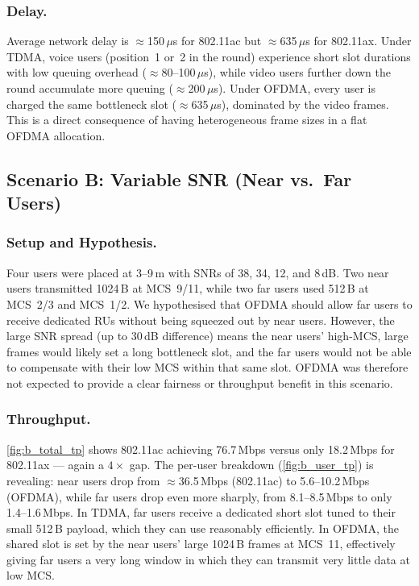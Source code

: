 \documentclass[twocolumn]{article}
\begin{document}
\subsubsection{Delay.}
Average network delay is $\approx$150\,$\mu$s for 802.11ac but $\approx$635\,$\mu$s for 802.11ax. Under TDMA, voice users (position~1 or~2 in the round) experience short slot durations with low queuing overhead ($\approx$80--100\,$\mu$s), while video users further down the round accumulate more queuing ($\approx$200\,$\mu$s). Under OFDMA, every user is charged the same bottleneck slot ($\approx$635\,$\mu$s), dominated by the video frames. This is a direct consequence of having heterogeneous frame sizes in a flat OFDMA allocation.

\subsection{Scenario B: Variable SNR (Near vs.\ Far Users)}

\subsubsection{Setup and Hypothesis.}
Four users were placed at 3--9\,m with SNRs of 38, 34, 12, and 8\,dB. Two near users transmitted 1024\,B at MCS~9/11, while two far users used 512\,B at MCS~2/3 and MCS~1/2. We hypothesised that OFDMA should allow far users to receive dedicated RUs without being squeezed out by near users. However, the large SNR spread (up to 30\,dB difference) means the near users' high-MCS, large frames would likely set a long bottleneck slot, and the far users would not be able to compensate with their low MCS within that same slot. OFDMA was therefore not expected to provide a clear fairness or throughput benefit in this scenario.

\subsubsection{Throughput.}
\autoref{fig:b_total_tp} shows 802.11ac achieving 76.7\,Mbps versus only 18.2\,Mbps for 802.11ax — again a $4\times$ gap. The per-user breakdown (\autoref{fig:b_user_tp}) is revealing: near users drop from $\approx$36.5\,Mbps (802.11ac) to 5.6--10.2\,Mbps (OFDMA), while far users drop even more sharply, from 8.1--8.5\,Mbps to only 1.4--1.6\,Mbps. In TDMA, far users receive a dedicated short slot tuned to their small 512\,B payload, which they can use reasonably efficiently. In OFDMA, the shared slot is set by the near users' large 1024\,B frames at MCS~11, effectively giving far users a very long window in which they can transmit very little data at low MCS.
\end{document}

